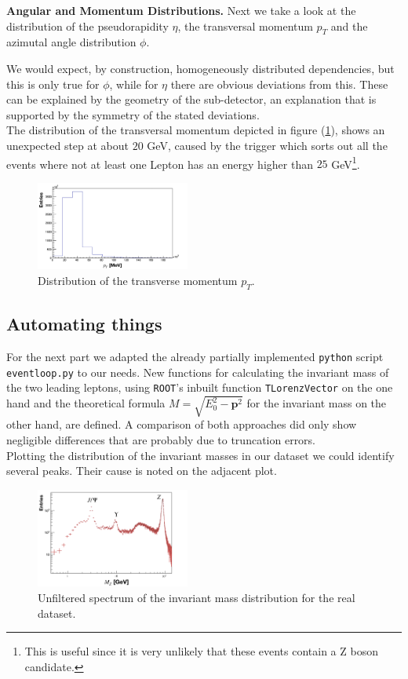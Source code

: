\documentclass[twocolumn,
			   showpacs,%
               nofootinbib,
               aps,%
               prd,
               notitlepage,
               showkeys,
               10pt]{revtex4-1}
\begin{document}
\textbf{Angular and Momentum Distributions.}  
Next we take a look at the distribution of  the pseudorapidity $\eta$, the transversal momentum $p_T$ and the azimutal angle distribution $\phi$.

We would expect, by construction, homogeneously distributed dependencies, but this is only true for $\phi$, while for $\eta$ there are obvious deviations from this.
These can  be explained by the geometry of the sub-detector, an explanation that is supported by the symmetry of the stated deviations.\\

The distribution of the transversal momentum depicted in figure (\ref{fig:p_t}), shows an unexpected step at about $20$ GeV, caused by the trigger which sorts out all the events where not at least one Lepton has an energy higher than $25$ GeV\footnote{This is useful since it is very unlikely that these events contain a Z boson candidate.}.
\begin{figure}[H]
	\centering
	\includegraphics[width=0.45\textwidth]{figures/plots/TransverseMomentum_corr}
	\caption{Distribution of the transverse momentum $p_T$.}
	\label{fig:p_t}
\end{figure}
\subsection{Automating things}
For the next part we adapted the already partially implemented \verb|python| script \verb|eventloop.py| to our needs. New functions for calculating the invariant mass of the two leading leptons, using \verb|ROOT|'s inbuilt function \verb|TLorenzVector| on the one hand and the theoretical formula $M = \sqrt{E_0^2 - \mathbf{p}^2}$ for the invariant mass on the other hand, are defined. A comparison of both approaches did only show negligible differences that are probably due to truncation errors.\\

Plotting the distribution of the invariant masses in our dataset we could identify several peaks. Their cause is noted on the adjacent plot.
\begin{figure}[H]
	\centering
	\includegraphics[width=0.45\textwidth]{figures/plots/MassDist_Data_corr}
	\caption{Unfiltered spectrum of the invariant mass distribution for the real dataset.}
\end{figure}
\end{document}
